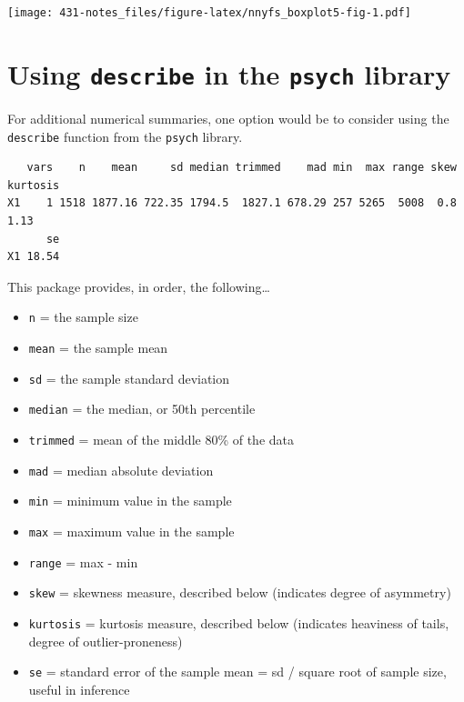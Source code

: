 \documentclass[
]{book}
\newenvironment{Shaded}{\begin{snugshade}}{\end{snugshade}}
\newcommand{\KeywordTok}[1]{\textcolor[rgb]{0.13,0.29,0.53}{\textbf{#1}}}
\newcommand{\NormalTok}[1]{#1}
\newcommand{\OperatorTok}[1]{\textcolor[rgb]{0.81,0.36,0.00}{\textbf{#1}}}
\providecommand{\tightlist}{%
  \setlength{\itemsep}{0pt}\setlength{\parskip}{0pt}}
\begin{document}
\texttt{[image: 431-notes\_files/figure-latex/nnyfs\_boxplot5-fig-1.pdf]}

\hypertarget{using-describe-in-the-psych-library}{%
\section{\texorpdfstring{Using \texttt{describe} in the \texttt{psych} library}{Using describe in the psych library}}\label{using-describe-in-the-psych-library}}

For additional numerical summaries, one option would be to consider using the \texttt{describe} function from the \texttt{psych} library.

\begin{Shaded}
\end{Shaded}

\begin{verbatim}
   vars    n    mean     sd median trimmed    mad min  max range skew kurtosis
X1    1 1518 1877.16 722.35 1794.5  1827.1 678.29 257 5265  5008  0.8     1.13
      se
X1 18.54
\end{verbatim}

This package provides, in order, the following\ldots{}

\begin{itemize}
\tightlist
\item
  \texttt{n} = the sample size
\item
  \texttt{mean} = the sample mean
\item
  \texttt{sd} = the sample standard deviation
\item
  \texttt{median} = the median, or 50th percentile
\item
  \texttt{trimmed} = mean of the middle 80\% of the data
\item
  \texttt{mad} = median absolute deviation
\item
  \texttt{min} = minimum value in the sample
\item
  \texttt{max} = maximum value in the sample
\item
  \texttt{range} = max - min
\item
  \texttt{skew} = skewness measure, described below (indicates degree of asymmetry)
\item
  \texttt{kurtosis} = kurtosis measure, described below (indicates heaviness of tails, degree of outlier-proneness)
\item
  \texttt{se} = standard error of the sample mean = sd / square root of sample size, useful in inference
\end{itemize}
\end{document}
